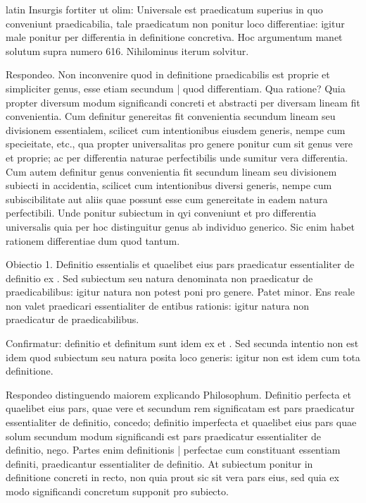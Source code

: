 \begin{otherlanguage*}{latin}
\pstart
 Insurgis fortiter ut olim: Universale est praedicatum superius in quo conveniunt praedicabilia, tale praedicatum non ponitur loco differentiae: igitur male ponitur per differentia in definitione concretiva. Hoc argumentum manet solutum supra numero 616. Nihilominus iterum solvitur. 
\pend

\pstart
 Respondeo. Non inconvenire quod in definitione praedicabilis est proprie et simpliciter genus, esse etiam secundum \textnormal{|}   quod differentiam. Qua ratione? Quia propter diversum modum significandi concreti et abstracti per diversam lineam fit convenientia. Cum definitur genereitas fit convenientia secundum lineam seu divisionem essentialem, scilicet cum intentionibus eiusdem generis, nempe cum specieitate, etc., qua propter universalitas pro genere ponitur cum sit genus vere et proprie; ac per differentia naturae perfectibilis unde sumitur vera differentia. Cum autem definitur genus convenientia fit secundum lineam seu divisionem subiecti in accidentia, scilicet cum intentionibus diversi generis, nempe cum subiscibilitate aut aliis quae possunt esse cum genereitate in eadem natura perfectibili. Unde ponitur subiectum in qyi conveniunt et pro differentia universalis quia per hoc distinguitur genus ab individuo generico. Sic enim habet rationem differentiae dum quod tantum. 
\pend

\pstart
 Obiectio 1. Definitio essentialis et quaelibet eius pars praedicatur essentialiter de definitio ex . Sed subiectum seu natura denominata non praedicatur de praedicabilibus: igitur natura non potest poni pro genere. Patet minor. Ens reale non valet praedicari essentialiter de entibus rationis: igitur natura non praedicatur de praedicabilibus. 
\pend

\pstart
 Confirmatur: definitio et definitum sunt idem ex  et . Sed secunda intentio non est idem quod subiectum seu natura posita loco generis: igitur non est idem cum tota definitione. 
\pend

\pstart
 Respondeo distinguendo maiorem explicando Philosophum. Definitio perfecta et quaelibet eius pars, quae vere et secundum rem significatam est pars praedicatur essentialiter de definitio, concedo; definitio imperfecta et quaelibet eius pars quae solum secundum modum significandi est pars praedicatur essentialiter de definitio, nego. Partes enim definitionis \textnormal{|} perfectae cum constituant essentiam definiti, praedicantur essentialiter de definitio. At subiectum ponitur in definitione concreti in recto, non quia prout sic sit vera pars eius, sed quia ex modo significandi concretum supponit pro subiecto. 
\pend


\end{otherlanguage*}
